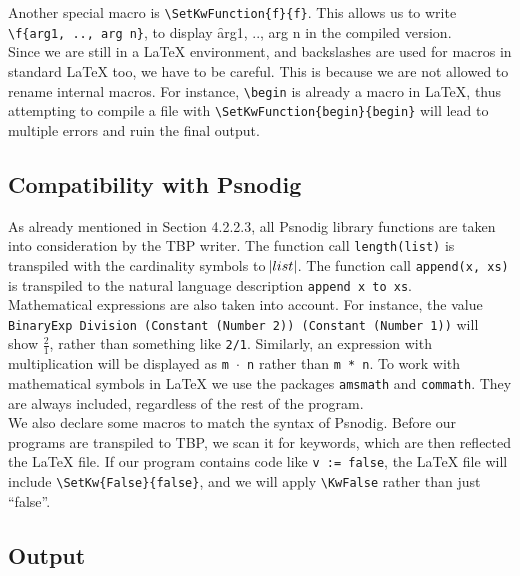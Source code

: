 Another special macro is \texttt{\textbackslash SetKwFunction\{f\}\{f\}}. This allows us to write \texttt{\textbackslash f\{arg1, .., arg n\}}, to display \f{arg1, .., arg n} in the compiled version. \\

Since we are still in a LaTeX environment, and backslashes are used for macros in standard LaTeX too, we have to be careful. This is because we are not allowed to rename internal macros. For instance, \texttt{\textbackslash begin} is already a macro in LaTeX, thus attempting to compile a file with \texttt{\textbackslash SetKwFunction\{begin\}\{begin\}} will lead to multiple errors and ruin the final output.

\subsection{Compatibility with Psnodig}

As already mentioned in Section 4.2.2.3, all Psnodig library functions are taken into consideration by the TBP writer. The function call \texttt{length(list)} is transpiled with the cardinality symbols to \hspace{.01cm} $\abs{list}$. The function call \texttt{append(x, xs)} is transpiled to the natural language description \texttt{append x to xs}. \\

Mathematical expressions are also taken into account. For instance, the value \texttt{BinaryExp Division (Constant (Number 2)) (Constant (Number 1))} will show $\frac{2}{1}$, rather than something like \texttt{2/1}. Similarly, an expression with multiplication will be displayed as \texttt{m $\cdot$ n} rather than \texttt{m * n}. To work with mathematical symbols in LaTeX we use the packages \texttt{amsmath} and \texttt{commath}. They are always included, regardless of the rest of the program. \\

We also declare some macros to match the syntax of Psnodig. Before our programs are transpiled to TBP, we scan it for keywords, which are then reflected the LaTeX file. If our program contains code like \texttt{v := false}, the LaTeX file will include \texttt{\textbackslash SetKw\{False\}\{false\}}, and we will apply \texttt{\textbackslash KwFalse} rather than just ``false''.

\subsection{Output}

